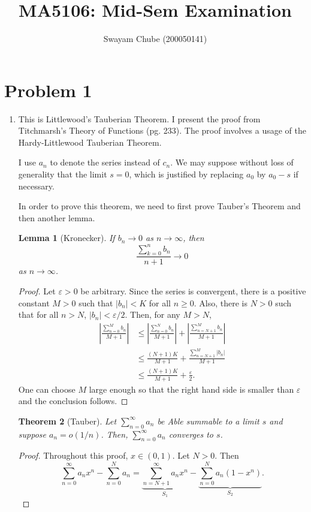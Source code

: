 \documentclass[12pt]{amsart}
\title{MA5106: Mid-Sem Examination}
\author{Swayam Chube (200050141)}
\newtheorem{theorem}{Theorem}
\newtheorem{lemma}[theorem]{Lemma}
\begin{document}
\maketitle

\section*{Problem 1}
\begin{enumerate}[label=(\alph*)]
\item This is Littlewood's Tauberian Theorem. I present the proof from Titchmarsh's Theory of Functions (pg. 233). The proof involves a usage of the Hardy-Littlewood Tauberian Theorem.

I use $a_n$ to denote the series instead of $c_n$. We may suppose without loss of generality that the limit $s = 0$, which is justified by replacing $a_0$ by $a_0 - s$ if necessary.

In order to prove this theorem, we need to first prove Tauber's Theorem and then another lemma.

\begin{lemma}[Kronecker]
	If $b_n\to 0$ as $n\to\infty$, then 
	\begin{equation*}
		\frac{\sum_{k = 0}^n b_n}{n + 1}\to 0
	\end{equation*}
	as $n\to\infty$.
\end{lemma}
\begin{proof}
	Let $\varepsilon > 0$ be arbitrary. Since the series is convergent, there is a positive constant $M > 0$ such that $|b_n| < K$ for all $n\ge 0$. Also, there is $N > 0$ such that for all $n > N$, $|b_n| < \varepsilon/2$. Then, for any $M > N$,
	\begin{align*}
		\left|\frac{\sum_{n = 0}^M b_n}{M + 1}\right|&\le\left|\frac{\sum_{n = 0}^N b_n}{M + 1}\right| + \left|\frac{\sum_{n = N + 1}^M b_n}{M + 1}\right|\\
		&\le\frac{(N + 1)K}{M + 1} + \frac{\sum_{n = N + 1}^M |b_n|}{M + 1}\\
		&\le\frac{(N + 1)K}{M + 1} + \frac{\varepsilon}{2}.
	\end{align*}
	One can choose $M$ large enough so that the right hand side is smaller than $\varepsilon$ and the conclusion follows.
\end{proof}

\begin{theorem}[Tauber]
	Let $\sum_{n = 0}^\infty a_n$ be Able summable to a limit $s$ and suppose $a_n = o(1/n)$. Then, $\sum_{n = 0}^\infty a_n$ converges to $s$.
\end{theorem}
\begin{proof}
	Throughout this proof, $x\in (0, 1)$. Let $N > 0$. Then
	\begin{equation*}
		\sum_{n = 0}^\infty a_nx^n - \sum_{n = 0}^N a_n = \underbrace{\sum_{n = N + 1}^\infty a_nx^n}_{S_1} - \underbrace{\sum_{n = 0}^N a_n(1 - x^n)}_{S_2}.
	\end{equation*}


\end{proof}
\end{enumerate}
\end{document}
